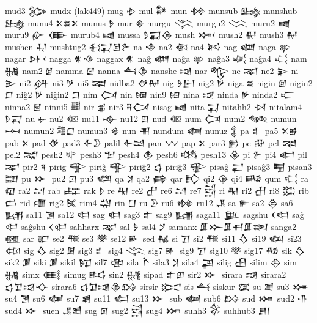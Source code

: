  mud3  𒉯   
 mudx  (lak449)   
 mug  𒈮   
 mul  𒀯   
 mun  𒁵   
 munsub  𒈰   
 munshub  𒈰   
 munu4  𒉽𒊺𒉽    
 munus  𒊩   
 mur  𒄯   
 murgu  𒋞   
 murgu2  𒈱   
 muru2  𒉠   
 muru9  𒅎𒂂    
 murub4  𒉠   
 mussa  𒊩𒍑𒁲    
 mush  𒈲   
 mush2  𒈽   
 mush3  𒈹   
 mushen  𒄷   
 mushtug2  𒈬𒍑𒌆𒉿    
 na  𒈾   
 na2  𒈿   
 na4  𒎎   
 nag  𒅘   
 naga  𒉀   
 nagar  𒉄   
 nagga  𒀭𒈾    
 naggax  𒀭   
 naĝ  𒅘   
 naĝa  𒉀   
 naĝa3  𒄤   
 naĝa4  𒄣   
 nam  𒉆   
 nam2  𒉇   
 namma  𒇉   
 nanna  𒋀𒆠    
 nanshe  𒀏   
 nar  𒈜   
 ne  𒉈   
 ne2  𒉌   
 ni  𒉌   
 ni2  𒉎   
 ni3  𒃻   
 ni5  𒉈   
 nidba2  𒉻𒈹    
 nig  𒊩𒌨    
 nig2  𒃻   
 niga  𒊺   
 nigin  𒇔   
 nigin2  𒆸   
 niĝ2  𒃻   
 niĝin2  𒆸   
 nim  𒉏   
 nin  𒎏   
 nin9  𒎐   
 nina  𒀏   
 ninda  𒃻   
 ninda2  𒉒   
 ninna2  𒇧   
 ninni5  𒌃   
 nir  𒉪   
 nir3  𒍝𒉏    
 nisag  𒉠   
 nita  𒍑   
 nitahh2  𒀴   
 nitalam4  𒊩𒍑    
 nu  𒉡   
 nu2  𒈿   
 nu11  𒉢   
 nu12  𒇻   
 nud  𒈿   
 num  𒉏   
 num2  𒈝   
 numun  𒆰   
 numun2  𒍤𒆸    
 numun3  𒄴   
 nun  𒉣   
 nundum  𒅻   
 nunuz  𒉭   
 pa  𒉺   
 pa5  𒉽𒂊    
 pab  𒉽   
 pad  𒉻   
 pad3  𒅆𒊒    
 palil  𒅆𒁺    
 pan  𒉼   
 pap  𒉽   
 par3  𒁖   
 pe  𒄫   
 pel  𒉈   
 pel2  𒉋   
 pesh2  𒉾   
 pesh3  𒈠   
 pesh4  𒊯   
 pesh6  𒆓   
 pesh13  𒊴   
 pi  𒉿   
 pi4  𒅗   
 pil  𒉈   
 pir2  𒎕   
 pirig  𒊊   
 piriĝ  𒊊   
 piriĝ2  𒌓   
 piriĝ3  𒊌   
 pisaĝ  𒂷   
 pisaĝ3  𒋄   
 pisan3  𒊿   
 pu  𒁍   
 pu2  𒇥   
 pu3  𒅤   
 qa  𒋡   
 qa2  𒂵   
 qar  𒃼   
 qi2  𒆠   
 qi4  𒄄   
 qum  𒄣   
 ra  𒊏   
 ra2  𒁺   
 rab  𒊐   
 rak  𒊩   
 re  𒊑   
 re2  𒌷   
 re6  𒁺   
 re7  𒁻   
 ri  𒊑   
 ri2  𒌷   
 ri8  𒈶   
 rib  𒆗   
 rid  𒈩   
 rig2  𒍮   
 rim4  𒁽   
 rin  𒆸   
 ru  𒊒   
 ru6  𒂔   
 ru12  𒂗   
 sa  𒊓   
 sa2  𒁲   
 sa6  𒊷   
 sa11  𒋜   
 sa12  𒊕   
 sag  𒊕   
 sag3  𒉺   
 sag9  𒊷   
 saga11  𒆥   
 sagshu  𒌋𒊕    
 saĝ  𒊕   
 saĝshu  𒌋𒊕    
 sahharx  𒉈   
 sal  𒊩   
 sal4  𒋡   
 samanx  𒂠𒁍𒂠𒉣𒂠𒌅    
 sanga2  𒊫   
 sar  𒊬   
 se2  𒍣   
 se3  𒋧   
 se12  𒅊   
 sed  𒈻   
 si  𒋛   
 si2  𒍣   
 si11  𒋝   
 si19  𒆉   
 si23  𒄢   
 sig  𒋝   
 sig2  𒋠   
 sig3  𒉺   
 sig4  𒋞   
 sig7  𒅊   
 sig9  𒋛   
 sig10  𒋧   
 sig17  𒄀   
 sik  𒋝   
 sik2  𒋠   
 siki  𒋠   
 sikil  𒂖   
 sil7  𒂣   
 sila  𒋻   
 sila3  𒋡   
 sila4  𒃢   
 silig  𒍂
 silim  𒁲
 sim  𒉆   
 simx  𒍼   
 simug  𒌣   
 sin2  𒉆   
 sipad  𒉺𒇻    
 sir2  𒁍   
 sirara  𒀏   
 sirara2  𒌓𒈣𒀏𒋓    
 sirara6  𒌓𒈣𒀏𒆠𒋳    
 sirsir  𒁎   
 sis  𒋀   
 siskur  𒀬   
 su  𒋢   
 su3  𒋤   
 su4  𒋜   
 su6  𒅾   
 su7  𒇭   
 su11  𒅗   
 su13  𒁍   
 sub  𒅢   
 sub6  𒋳   
 sud  𒋤   
 sud2  𒋥   
 sud4  𒁍   
 suen  𒂗𒍪    
 sug  𒆹
 sug2 𒁻
 sug4  𒋤   
 suhh3  𒄗   
 suhhub3  𒋗𒁹    
